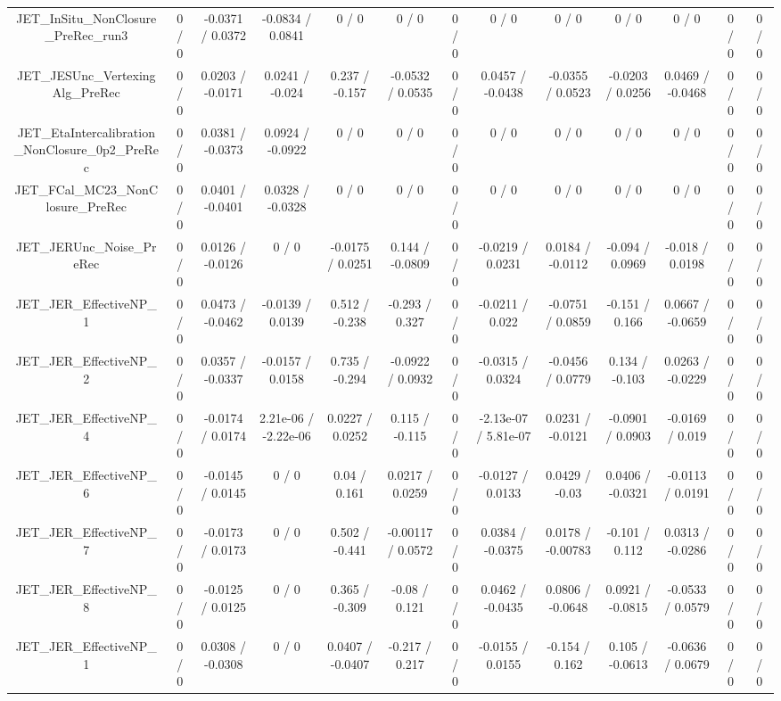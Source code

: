 \documentclass[10pt]{article}
\begin{document}
\begin{table}[htbp]
\begin{center}
\begin{tabular}{|c|c|c|c|c|c|c|c|c|c|c|c|c|}
  JET_InSitu_NonClosure_PreRec_run3 & 0 / 0 & -0.0371 / 0.0372 & -0.0834 / 0.0841 & 0 / 0 & 0 / 0 & 0 / 0 & 0 / 0 & 0 / 0 & 0 / 0 & 0 / 0 & 0 / 0 & 0 / 0 \\ 
  JET_JESUnc_VertexingAlg_PreRec & 0 / 0 & 0.0203 / -0.0171 & 0.0241 / -0.024 & 0.237 / -0.157 & -0.0532 / 0.0535 & 0 / 0 & 0.0457 / -0.0438 & -0.0355 / 0.0523 & -0.0203 / 0.0256 & 0.0469 / -0.0468 & 0 / 0 & 0 / 0 \\ 
  JET_EtaIntercalibration_NonClosure_0p2_PreRec & 0 / 0 & 0.0381 / -0.0373 & 0.0924 / -0.0922 & 0 / 0 & 0 / 0 & 0 / 0 & 0 / 0 & 0 / 0 & 0 / 0 & 0 / 0 & 0 / 0 & 0 / 0 \\ 
  JET_FCal_MC23_NonClosure_PreRec & 0 / 0 & 0.0401 / -0.0401 & 0.0328 / -0.0328 & 0 / 0 & 0 / 0 & 0 / 0 & 0 / 0 & 0 / 0 & 0 / 0 & 0 / 0 & 0 / 0 & 0 / 0 \\ 
  JET_JERUnc_Noise_PreRec & 0 / 0 & 0.0126 / -0.0126 & 0 / 0 & -0.0175 / 0.0251 & 0.144 / -0.0809 & 0 / 0 & -0.0219 / 0.0231 & 0.0184 / -0.0112 & -0.094 / 0.0969 & -0.018 / 0.0198 & 0 / 0 & 0 / 0 \\ 
  JET_JER_EffectiveNP_1 & 0 / 0 & 0.0473 / -0.0462 & -0.0139 / 0.0139 & 0.512 / -0.238 & -0.293 / 0.327 & 0 / 0 & -0.0211 / 0.022 & -0.0751 / 0.0859 & -0.151 / 0.166 & 0.0667 / -0.0659 & 0 / 0 & 0 / 0 \\ 
  JET_JER_EffectiveNP_2 & 0 / 0 & 0.0357 / -0.0337 & -0.0157 / 0.0158 & 0.735 / -0.294 & -0.0922 / 0.0932 & 0 / 0 & -0.0315 / 0.0324 & -0.0456 / 0.0779 & 0.134 / -0.103 & 0.0263 / -0.0229 & 0 / 0 & 0 / 0 \\ 
  JET_JER_EffectiveNP_4 & 0 / 0 & -0.0174 / 0.0174 & 2.21e-06 / -2.22e-06 & 0.0227 / 0.0252 & 0.115 / -0.115 & 0 / 0 & -2.13e-07 / 5.81e-07 & 0.0231 / -0.0121 & -0.0901 / 0.0903 & -0.0169 / 0.019 & 0 / 0 & 0 / 0 \\ 
  JET_JER_EffectiveNP_6 & 0 / 0 & -0.0145 / 0.0145 & 0 / 0 & 0.04 / 0.161 & 0.0217 / 0.0259 & 0 / 0 & -0.0127 / 0.0133 & 0.0429 / -0.03 & 0.0406 / -0.0321 & -0.0113 / 0.0191 & 0 / 0 & 0 / 0 \\ 
  JET_JER_EffectiveNP_7 & 0 / 0 & -0.0173 / 0.0173 & 0 / 0 & 0.502 / -0.441 & -0.00117 / 0.0572 & 0 / 0 & 0.0384 / -0.0375 & 0.0178 / -0.00783 & -0.101 / 0.112 & 0.0313 / -0.0286 & 0 / 0 & 0 / 0 \\ 
  JET_JER_EffectiveNP_8 & 0 / 0 & -0.0125 / 0.0125 & 0 / 0 & 0.365 / -0.309 & -0.08 / 0.121 & 0 / 0 & 0.0462 / -0.0435 & 0.0806 / -0.0648 & 0.0921 / -0.0815 & -0.0533 / 0.0579 & 0 / 0 & 0 / 0 \\ 
  JET_JER_EffectiveNP_1 & 0 / 0 & 0.0308 / -0.0308 & 0 / 0 & 0.0407 / -0.0407 & -0.217 / 0.217 & 0 / 0 & -0.0155 / 0.0155 & -0.154 / 0.162 & 0.105 / -0.0613 & -0.0636 / 0.0679 & 0 / 0 & 0 / 0 \\ 

\end{tabular}
\end{center}
\end{table}
\end{document}
